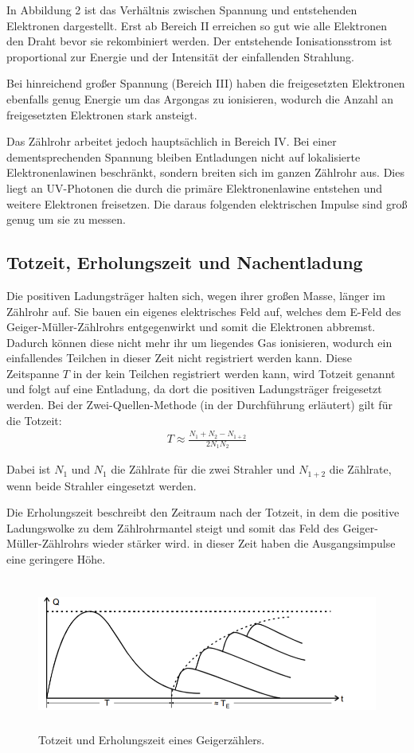  In Abbildung 2 ist das Verhältnis zwischen Spannung und entstehenden Elektronen dargestellt. Erst ab Bereich II
erreichen so gut wie alle Elektronen den Draht bevor sie rekombiniert werden. Der entstehende Ionisationsstrom ist
proportional zur Energie und der Intensität der einfallenden Strahlung.

Bei hinreichend großer Spannung (Bereich III) haben die freigesetzten Elektronen ebenfalls genug Energie um das Argongas zu ionisieren,
wodurch die Anzahl an freigesetzten Elektronen stark ansteigt.

Das Zählrohr arbeitet jedoch hauptsächlich in Bereich IV. Bei einer dementsprechenden Spannung bleiben Entladungen nicht
auf lokalisierte Elektronenlawinen beschränkt, sondern breiten sich im ganzen Zählrohr aus. Dies liegt
an UV-Photonen die durch die primäre Elektronenlawine entstehen und weitere Elektronen freisetzen. Die
daraus folgenden elektrischen Impulse sind groß genug um sie zu messen.

\subsection{Totzeit, Erholungszeit und Nachentladung}

Die positiven Ladungsträger halten sich, wegen ihrer großen Masse, länger im Zählrohr auf. Sie bauen ein eigenes
elektrisches Feld auf, welches dem E-Feld des Geiger-Müller-Zählrohrs entgegenwirkt und somit die Elektronen abbremst.
Dadurch können diese nicht mehr ihr um liegendes Gas ionisieren, wodurch ein einfallendes Teilchen in dieser Zeit
nicht registriert werden kann. Diese Zeitspanne $T$ in der kein Teilchen registriert werden kann, wird Totzeit genannt
und folgt auf eine Entladung, da dort die positiven Ladungsträger freigesetzt werden.
Bei der Zwei-Quellen-Methode (in der Durchführung erläutert) gilt für die Totzeit:
\begin{align}
  T \approx \frac{N_1 + N_2- N_{1+2}}{2 N_1 N_2}
\end{align}

Dabei ist $N_1$ und $N_1$ die Zählrate für die zwei Strahler und $N_{1+2}$ die Zählrate,
wenn beide Strahler eingesetzt werden.

Die Erholungszeit beschreibt den Zeitraum nach der Totzeit, in dem die positive Ladungswolke zu dem Zählrohrmantel steigt und somit
das Feld des Geiger-Müller-Zählrohrs wieder stärker wird. in dieser Zeit haben die Ausgangsimpulse eine geringere Höhe.


\begin{figure}[H]
  \centering
  \includegraphics[height=5cm]{totzeit.PNG}
  \caption{Totzeit und Erholungszeit eines Geigerzählers. \cite{sample}}
  \label{fig:totzeit}
\end{figure}

